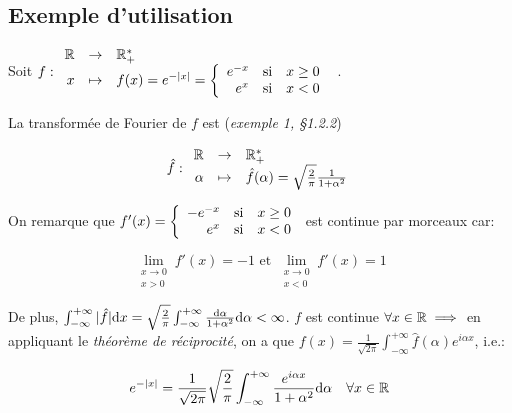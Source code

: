 \subsection{Exemple d'utilisation}

\begin{example}
    Soit $
    f:
    \begin{array}{r c l}
    \mathbb{R} & \rightarrow & \mathbb{R}_+^* \\
    x  & \mapsto & f(x) = e^{-|x|} =
    \left \{
    \begin{array}{r c l}
    e^{-x} & \textrm{si} & x \geq 0 \\
    e^x    & \textrm{si} & x < 0
    \end{array}
    \right.
    \end{array}
    $.
    
    La transformée de Fourier de $f$ est (\textit{exemple 1, §1.2.2})
    
    \[
    \hat{f}:
    \begin{array}{r c l}
    \mathbb{R} & \rightarrow & \mathbb{R}_+^* \\
    \alpha & \mapsto & \hat{f}(\alpha) =
    \sqrt{\frac{2}{\pi}} \frac{1}{1 + \alpha^2}
    \end{array}
    \]

    On remarque que $f'(x) =
    \left\{
    \begin{array}{r c l}
    -e^{-x} & \textrm{si} & x \geq 0 \\
    e^x    & \textrm{si} & x < 0
    \end{array}
    \right.$
    est continue par morceaux car:
    
    \[\lim\limits_{\substack{x \rightarrow 0 \\ x > 0}} f'(x) = -1 \textrm{ et } \lim\limits_{\substack{x \rightarrow 0 \\ x < 0}} f'(x) = 1\]
    
    \newpage
    
    De plus, $\int_{-\infty}^{+\infty} |\hat{f}|\mathrm{d}x = \sqrt{\frac{2}{\pi}} \int_{-\infty}^{+\infty} \frac{\mathrm{d}\alpha}{1 + \alpha^2} \mathrm{d}\alpha < \infty$.
    $f$ est continue $\forall x \in \mathbb{R} \implies$ en appliquant le \textit{théorème de réciprocité}, on a que $f(x) = \frac{1}{\sqrt{2 \pi}} \int_{-\infty}^{+\infty} \hat{f}(\alpha) e^{i\alpha x}$, i.e.:
    
    \[
    e^{-|x|} =
    \frac{1}{\sqrt{2 \pi}} \sqrt{\frac{2}{\pi}} \int_{-\infty}^{+\infty} \frac{e^{i\alpha x}}{1 + \alpha^2}\mathrm{d}\alpha
    \quad \forall x \in \mathbb{R}
    \]
    

\end{example}
